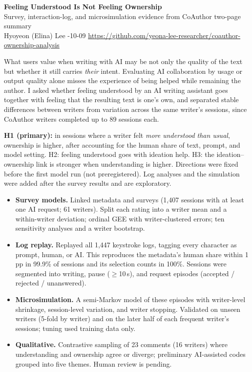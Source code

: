 \documentclass[10pt]{article}
\newcommand{\head}[1]{\par\medskip\noindent{\large\bfseries #1}\par\smallskip}
\begin{document}
\begin{center}
{\Large\bfseries Feeling Understood Is Not Feeling Ownership}\\[3pt]
{\normalsize Survey, interaction-log, and microsimulation evidence from CoAuthor \textemdash{} two-page summary}\\[2pt]
{\small Hyoyeon (Elina) Lee -10-09 \quad \url{https://github.com/yeona-lee-researcher/coauthor-ownership-analysis}}
\end{center}

\head{(1) Motivation}
What users value when writing with AI may be not only the quality of the text but whether it still carries \emph{their} intent.
Evaluating AI collaboration by usage or output quality alone misses the experience of being helped while remaining the author.
I asked whether feeling understood by an AI writing assistant goes together with feeling that the resulting text is one's own,
and separated stable differences between writers from variation across the same writer's sessions, since CoAuthor writers completed up to 89 sessions each.

\head{(2) Hypothesis}
\textbf{H1 (primary):} in sessions where a writer felt \emph{more understood than usual}, ownership is higher, after accounting for the human share of text, prompt, and model setting.
H2: feeling understood goes with ideation help. H3: the ideation--ownership link is stronger when understanding is higher.
Directions were fixed before the first model run (not preregistered). Log analyses and the simulation were added after the survey results and are exploratory.

\head{(3) Approach}
\begin{itemize}
  \item \textbf{Survey models.} Linked metadata and surveys (1,407 sessions with at least one AI request; 61 writers). Split each rating into a writer mean and a within-writer deviation; ordinal GEE with writer-clustered errors; ten sensitivity analyses and a writer bootstrap.
  \item \textbf{Log replay.} Replayed all 1,447 keystroke logs, tagging every character as prompt, human, or AI. This reproduces the metadata's human share within 1 pp in 99.9\% of sessions and its selection counts in 100\%. Sessions were segmented into writing, pause ($\ge$10\,s), and request episodes (accepted / rejected / unanswered).
  \item \textbf{Microsimulation.} A semi-Markov model of these episodes with writer-level shrinkage, session-level variation, and writer stopping. Validated on unseen writers (5-fold by writer) and on the later half of each frequent writer's sessions; tuning used training data only.
  \item \textbf{Qualitative.} Contrastive sampling of 23 comments (16 writers) where understanding and ownership agree or diverge; preliminary AI-assisted codes grouped into five themes. Human review is pending.
\end{itemize}
\end{document}
